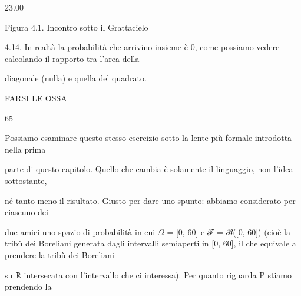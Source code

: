 \documentclass[a4paper,portrait,12pt]{article}
\begin{document}
23.00





\begin{flushleft}
Figura 4.1. Incontro sotto il Grattacielo
\end{flushleft}


\begin{flushleft}
4.14. In realt\`{a} la probabilit\`{a} che arrivino insieme \`{e} 0, come possiamo vedere calcolando il rapporto tra l'area della
\end{flushleft}


\begin{flushleft}
diagonale (nulla) e quella del quadrato.
\end{flushleft}





\begin{flushleft}
 FARSI LE OSSA
\end{flushleft}





65





\begin{flushleft}
Possiamo esaminare questo stesso esercizio sotto la lente più formale introdotta nella prima
\end{flushleft}


\begin{flushleft}
parte di questo capitolo. Quello che cambia \`{e} solamente il linguaggio, non l'idea sottostante,
\end{flushleft}


\begin{flushleft}
n\'{e} tanto meno il risultato. Giusto per dare uno spunto: abbiamo considerato per ciascuno dei
\end{flushleft}


\begin{flushleft}
due amici uno spazio di probabilit\`{a} in cui $\Omega$ = [0, 60] e ℱ = ℬ([0, 60]) (cio\`{e} la tribù dei Boreliani generata dagli intervalli semiaperti in [0, 60], il che equivale a prendere la tribù dei Boreliani
\end{flushleft}


\begin{flushleft}
su ℝ intersecata con l'intervallo che ci interessa). Per quanto riguarda P stiamo prendendo la
\end{flushleft}
\end{document}
